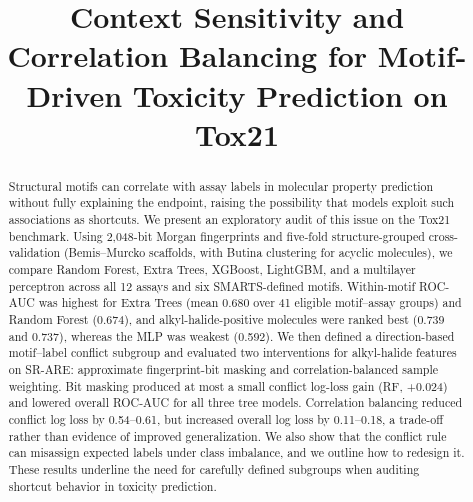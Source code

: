 \documentclass[conference]{IEEEtran}
\begin{document}
\title{Context Sensitivity and Correlation Balancing for Motif-Driven Toxicity Prediction on Tox21}

\author{
\and
{}
}

\maketitle

\begin{abstract}
Structural motifs can correlate with assay labels in molecular property prediction without fully explaining the endpoint, raising the possibility that models exploit such associations as shortcuts. We present an exploratory audit of this issue on the Tox21 benchmark. Using 2,048-bit Morgan fingerprints and five-fold structure-grouped cross-validation (Bemis--Murcko scaffolds, with Butina clustering for acyclic molecules), we compare Random Forest, Extra Trees, XGBoost, LightGBM, and a multilayer perceptron across all 12 assays and six SMARTS-defined motifs. Within-motif ROC-AUC was highest for Extra Trees (mean 0.680 over 41 eligible motif--assay groups) and Random Forest (0.674), and alkyl-halide-positive molecules were ranked best (0.739 and 0.737), whereas the MLP was weakest (0.592). We then defined a direction-based motif--label conflict subgroup and evaluated two interventions for alkyl-halide features on SR-ARE: approximate fingerprint-bit masking and correlation-balanced sample weighting. Bit masking produced at most a small conflict log-loss gain (RF, +0.024) and lowered overall ROC-AUC for all three tree models. Correlation balancing reduced conflict log loss by 0.54--0.61, but increased overall log loss by 0.11--0.18, a trade-off rather than evidence of improved generalization. We also show that the conflict rule can misassign expected labels under class imbalance, and we outline how to redesign it. These results underline the need for carefully defined subgroups when auditing shortcut behavior in toxicity prediction.
\end{abstract}
\end{document}
